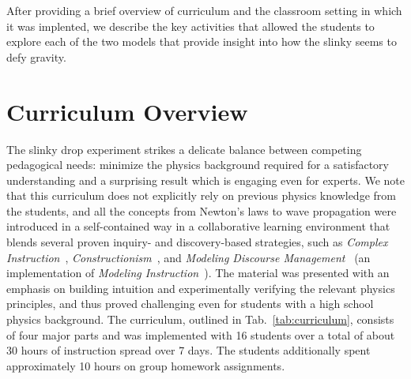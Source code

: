 \documentclass[pre,preprint,superscriptaddress,longbibliography]{revtex4-1}
\begin{document}
After providing a brief overview of curriculum and the classroom setting in which it was implented, we describe the key activities that allowed the students to explore each of the two models that provide insight into how the slinky seems to defy gravity.   

\section{Curriculum Overview}

 

%
%


The slinky drop experiment strikes a delicate balance between competing pedagogical needs: minimize the physics background required for a satisfactory understanding and a surprising result which is engaging even for experts. 
We note that this curriculum does not explicitly rely on previous physics knowledge from the students, and all the concepts from Newton's laws to wave propagation were introduced in a self-contained way in a collaborative learning environment that blends several proven inquiry- and discovery-based strategies, such as \emph{Complex Instruction}~\cite{Cohen1997}, \emph{Constructionism}~\cite{Papert1991}, and \emph{Modeling Discourse Management}~\cite{Desbien2002} (an implementation of \emph{Modeling Instruction}~\cite{Brewe2008}).   The material was presented with an emphasis on building intuition and experimentally verifying the relevant physics principles, and thus proved challenging even for students with a high school physics background.  The curriculum, outlined in Tab.~\ref{tab:curriculum}, consists of four major parts and was implemented with 16 students over a total of about 30 hours of instruction spread over 7 days. The students additionally spent approximately 10 hours on group homework assignments. 
\end{document}
